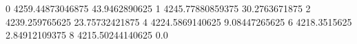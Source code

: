 0 4259.44873046875 43.9462890625
1 4245.77880859375 30.2763671875
2 4239.259765625 23.75732421875
4 4224.5869140625 9.08447265625
6 4218.3515625 2.84912109375
8 4215.50244140625 0.0
